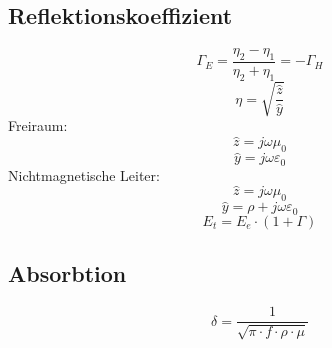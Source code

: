 \documentclass[a4paper, 10pt, fleqn]{article}
\begin{document}
\subsection{Reflektionskoeffizient}
\[ \Gamma_E = \frac{\eta_2 - \eta_1}{\eta_2 + \eta_1} = -\Gamma_H \]
\[ \eta = \sqrt{\frac{\hat{z}}{\hat{y}}} \]
Freiraum: 
\[ \hat{z} = j \omega\mu_0 \]
\[ \hat{y} = j \omega \varepsilon_0 \]
Nichtmagnetische Leiter:
\[ \hat{z} = j \omega\mu_0 \]
\[ \hat{y} = \rho + j \omega \varepsilon_0 \]
\[ E_t = E_e \cdot (1 + \Gamma) \]

\subsection{Absorbtion}
\[ \delta = \frac{1}{\sqrt{\pi \cdot f \cdot \rho \cdot \mu}} \]
\end{document}
